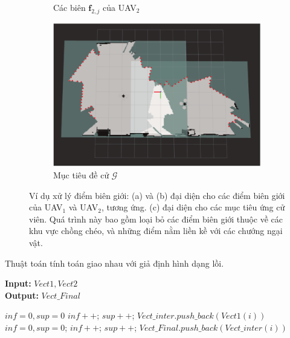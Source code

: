 \documentclass[11pt,openany]{book}
\begin{document}
\begin{figure}[H]
\begin{subfigure}[H]{0.6\linewidth}
        \caption{{Các biên $\mathbf{f}_{2,j}$ của UAV$_2$}}
        \label{fig:3.5b}
    \end{subfigure}
    \begin{subfigure}[H]{0.6\linewidth}
        \centering
        \includegraphics[width=\linewidth]{assets/3_5_c.png}
        \caption{{Mục tiêu đề cử $\mathcal{G}$}}
        \label{fig:3.5c}
    \end{subfigure}
    \caption{Ví dụ xử lý điểm biên giới: (a) và (b) đại diện cho các điểm biên giới của UAV$_1$ và UAV$_2$, tương ứng. (c) đại diện cho các mục tiêu ứng cử viên. Quá trình này bao gồm loại bỏ các điểm biên giới thuộc về các khu vực chồng chéo, và những điểm nằm liền kề với các chướng ngại vật.}
    \label{fig:3.5}
\end{figure}
\begin{algorithm}[H]
    \caption{Thuật toán tính toán giao nhau với giả định hình dạng lồi.}
    \label{alg:3.3}
    \hspace*{\algorithmicindent} \textbf{Input:} $Vect1, Vect2$ \\
    \hspace*{\algorithmicindent} \textbf{Output:} $Vect\_Final$
    \begin{algorithmic}[1]
        \STATE $inf = 0, sup = 0$
        \STATE $inf++$;
        \ELSE
        \STATE $sup++$;
        \ENDIF
        \ENDFOR
        \STATE $Vect\_inter.push\_back(Vect1(i))$
        \ENDIF
        \ENDFOR
        \STATE $inf=0,sup=0$;
        \STATE $inf++$;
        \ELSE
        \STATE $sup++$;
        \ENDIF
        \ENDFOR
        \STATE $Vect\_Final.push\_back(Vect\_inter(i))$
        \ENDIF
        \ENDFOR
    \end{algorithmic}
\end{algorithm}
\end{document}

